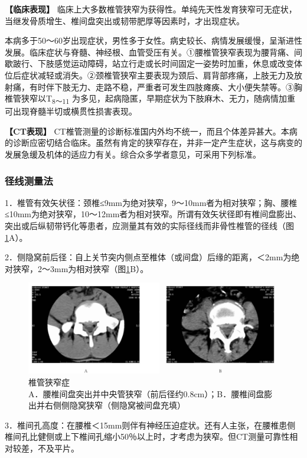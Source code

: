\textbf{【临床表现】}
临床上大多数椎管狭窄为获得性。单纯先天性发育狭窄可无症状，当继发骨质增生、椎间盘突出或韧带肥厚等因素时，才出现症状。

本病多于50～60岁出现症状，男性多于女性。病史较长、病情发展缓慢，呈渐进性发展。临床症状与脊髓、神经根、血管受压有关。①腰椎管狭窄表现为腰背痛、间歇跛行、下肢感觉运动障碍，站立行走或长时间固定一姿势时加重，休息或改变体位后症状减轻或消失。②颈椎管狭窄主要表现为颈后、肩背部疼痛，上肢无力及放射痛，有时伴下肢无力、走路不稳，严重者可发生四肢瘫痪、大小便失禁等。③胸椎管狭窄以T\textsubscript{8～11}
为多见，起病隐匿，早期症状为下肢麻木、无力，随病情加重可出现脊髓半切或横贯性损害表现。

\textbf{【CT表现】}
CT椎管测量的诊断标准国内外均不统一，而且个体差异甚大。本病的诊断应密切结合临床。虽然有肯定的狭窄存在，并非一定产生症状，这与病变的发展急缓及机体的适应力有关。综合众多学者意见，可采用下列标准。

\subsubsection{径线测量法}

1．椎管有效矢状径：颈椎≤9mm为绝对狭窄，9～10mm者为相对狭窄；胸、腰椎≤10mm为绝对狭窄，10～12mm者为相对狭窄。所谓有效矢状径即有椎间盘膨出、突出或后纵韧带钙化等患者，应测量其有效的实际径线而非骨性椎管的径线（图\ref{fig23-14}A）。

2．侧隐窝前后径：自上关节突内侧点至椎体（或间盘）后缘的距离，＜2mm为绝对狭窄，2～3mm为相对狭窄（图\ref{fig23-14}B）。

\begin{figure}[!htbp]
 \centering
 \includegraphics[width=.7\textwidth,height=\textheight,keepaspectratio]{./images/Image00477.jpg}
 \captionsetup{justification=centering}
 \caption{椎管狭窄症\\{\small A．腰椎间盘突出并中央管狭窄（前后径约0.8cm）；B．腰椎间盘膨出并右侧侧隐窝狭窄（侧隐窝被间盘充填）}}
 \label{fig23-14}
  \end{figure} 

3．椎间孔高度：在腰椎＜15mm则伴有神经压迫症状。还有人主张，在腰椎患侧椎间孔比健侧或上下椎间孔缩小50％以上时，才考虑为狭窄。但CT测量可靠性相对较差，不及平片。


